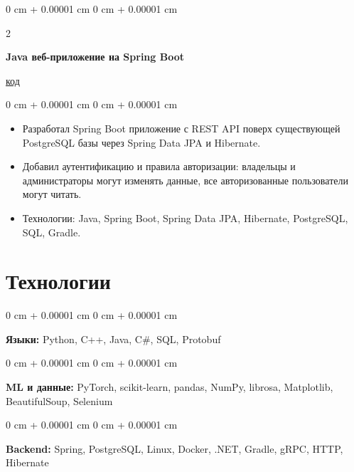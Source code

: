 \documentclass[10pt, letterpaper]{article}
\newenvironment{highlights}{
    \begin{itemize}[
        topsep=0.10 cm,
        parsep=0.10 cm,
        partopsep=0pt,
        itemsep=0pt,
        leftmargin=0 cm + 10pt
    ]
}{
    \end{itemize}
}
\newenvironment{onecolentry}{
    \begin{adjustwidth}{
        0 cm + 0.00001 cm
    }{
        0 cm + 0.00001 cm
    }
}{
    \end{adjustwidth}
}
\newenvironment{twocolentry}[2][]{
    \onecolentry
    \def\secondColumn{#2}
    \setcolumnwidth{\fill, 4.5 cm}
    \begin{paracol}{2}
}{
    \switchcolumn \raggedleft \secondColumn
    \end{paracol}
    \endonecolentry
}
\begin{document}
        \vspace{0.2 cm}

        \begin{twocolentry}{
            \href{https://github.com/Komperlan/Labs/blob/main/Java/Lab4/lab-4.md}{код}
        }
            \textbf{Java веб-приложение на Spring Boot}
        \end{twocolentry}

        \vspace{0.10 cm}
        \begin{onecolentry}
            \begin{highlights}
                \item Разработал Spring Boot приложение с REST API поверх существующей PostgreSQL базы через Spring Data JPA и Hibernate.
                \item Добавил аутентификацию и правила авторизации: владельцы и администраторы могут изменять данные, все авторизованные пользователи могут читать.
                \item Технологии: Java, Spring Boot, Spring Data JPA, Hibernate, PostgreSQL, SQL, Gradle.
            \end{highlights}
        \end{onecolentry}

    \section{Технологии}

        \begin{onecolentry}
            \textbf{Языки:} Python, C++, Java, C\#, SQL, Protobuf
        \end{onecolentry}

        \vspace{0.2 cm}

        \begin{onecolentry}
            \textbf{ML и данные:} PyTorch, scikit-learn, pandas, NumPy, librosa, Matplotlib, BeautifulSoup, Selenium
        \end{onecolentry}

        \vspace{0.2 cm}

        \begin{onecolentry}
            \textbf{Backend:} Spring, PostgreSQL, Linux, Docker, .NET, Gradle, gRPC, HTTP, Hibernate
        \end{onecolentry}
\end{document}
